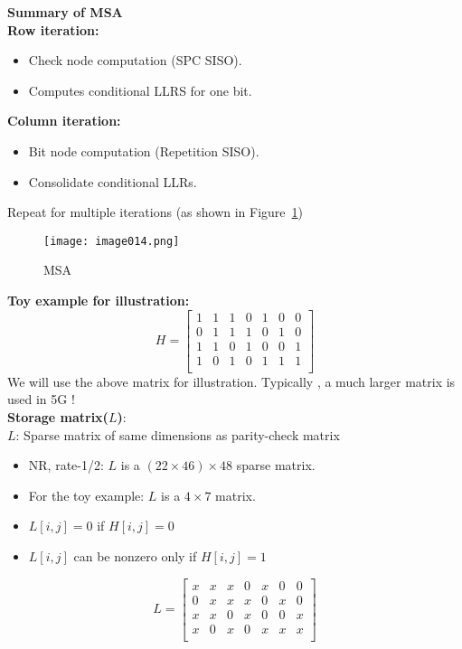 \textbf{Summary of MSA} \\
\textbf{Row iteration:} \\
\begin{itemize}
    \item Check node computation (SPC SISO).
    \item Computes conditional LLRS for one bit.
\end{itemize}
\textbf{Column iteration:} \\
\begin{itemize}
    \item Bit node computation (Repetition SISO).
    \item Consolidate conditional LLRs.
\end{itemize}
Repeat for multiple iterations (as shown in Figure~\ref{fig:MSA})
\begin{figure}[ht]
    \centering
    \texttt{[image: image014.png]}
    \caption{MSA}
    \label{fig:MSA}
\end{figure}
\textbf{Toy example for illustration:}\\
\[ H=\left[\begin{matrix}1&1&1&0&1&0&0\\0&1&1&1&0&1&0\\1&1&0&1&0&0&1\\1&0&1&0&1&1&1\\\end{matrix}\right] \]
We will use the above matrix for illustration. Typically , a much larger matrix is used in 5G !\\
\textbf{Storage matrix($L$)}:\\
$L$: Sparse matrix of same dimensions as parity-check matrix
\begin{itemize}
    \item NR, rate-1/2: $L$ is a $(22 \times 46) \times 48$ sparse matrix.
    \item For the toy example: $L$ is a $4 \times 7$ matrix.
    \item $L[i , j] = 0$ if $H[i , j] = 0$
    \item $L[i , j]$ can be nonzero only if $H[i , j] = 1$
\end{itemize}
\[ L=\left[\begin{matrix}x&x&x&0&x&0&0\\0&x&x&x&0&x&0\\x&x&0&x&0&0&x\\x&0&x&0&x&x&x\\\end{matrix}\right] \]
